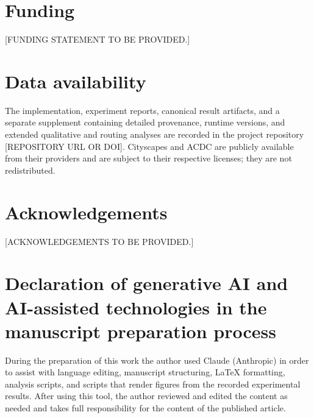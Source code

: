 \documentclass[a4paper,5p]{elsarticle}
\begin{document}
\section*{Funding}

[FUNDING STATEMENT TO BE PROVIDED.]

\section*{Data availability}

The implementation, experiment reports, canonical result artifacts, and a separate supplement containing detailed provenance, runtime versions, and extended qualitative and routing analyses are recorded in the project repository [REPOSITORY URL OR DOI]. Cityscapes and ACDC are publicly available from their providers and are subject to their respective licenses; they are not redistributed.

\section*{Acknowledgements}

[ACKNOWLEDGEMENTS TO BE PROVIDED.]

\section*{Declaration of generative AI and AI-assisted technologies in the manuscript preparation process}

During the preparation of this work the author used Claude (Anthropic) in order to assist with language editing, manuscript structuring, LaTeX formatting, analysis scripts, and scripts that render figures from the recorded experimental results. After using this tool, the author reviewed and edited the content as needed and takes full responsibility for the content of the published article.



\end{document}
